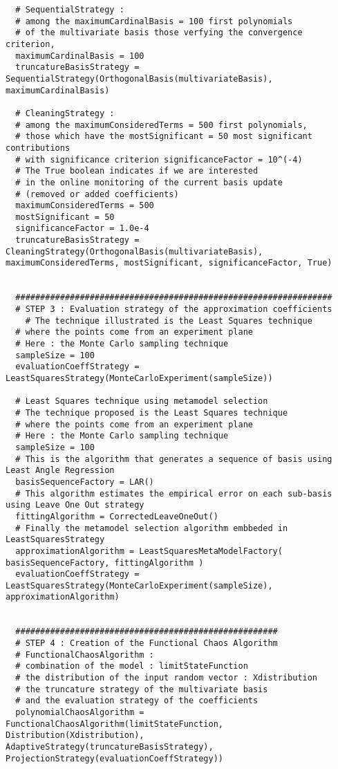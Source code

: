 \begin{lstlisting}
  # SequentialStrategy :
  # among the maximumCardinalBasis = 100 first polynomials
  # of the multivariate basis those verfying the convergence criterion,
  maximumCardinalBasis = 100
  truncatureBasisStrategy = SequentialStrategy(OrthogonalBasis(multivariateBasis), maximumCardinalBasis)

  # CleaningStrategy : 
  # among the maximumConsideredTerms = 500 first polynomials,
  # those which have the mostSignificant = 50 most significant contributions 
  # with significance criterion significanceFactor = 10^(-4)
  # The True boolean indicates if we are interested
  # in the online monitoring of the current basis update
  # (removed or added coefficients)
  maximumConsideredTerms = 500
  mostSignificant = 50
  significanceFactor = 1.0e-4
  truncatureBasisStrategy = CleaningStrategy(OrthogonalBasis(multivariateBasis), maximumConsideredTerms, mostSignificant, significanceFactor, True)


  ################################################################
  # STEP 3 : Evaluation strategy of the approximation coefficients
    # The technique illustrated is the Least Squares technique
  # where the points come from an experiment plane
  # Here : the Monte Carlo sampling technique
  sampleSize = 100
  evaluationCoeffStrategy = LeastSquaresStrategy(MonteCarloExperiment(sampleSize))

  # Least Squares technique using metamodel selection
  # The technique proposed is the Least Squares technique
  # where the points come from an experiment plane
  # Here : the Monte Carlo sampling technique
  sampleSize = 100
  # This is the algorithm that generates a sequence of basis using Least Angle Regression
  basisSequenceFactory = LAR()
  # This algorithm estimates the empirical error on each sub-basis using Leave One Out strategy
  fittingAlgorithm = CorrectedLeaveOneOut()
  # Finally the metamodel selection algorithm embbeded in LeastSquaresStrategy
  approximationAlgorithm = LeastSquaresMetaModelFactory( basisSequenceFactory, fittingAlgorithm )
  evaluationCoeffStrategy = LeastSquaresStrategy(MonteCarloExperiment(sampleSize), approximationAlgorithm)


  #####################################################
  # STEP 4 : Creation of the Functional Chaos Algorithm 
  # FunctionalChaosAlgorithm :
  # combination of the model : limitStateFunction
  # the distribution of the input random vector : Xdistribution
  # the truncature strategy of the multivariate basis
  # and the evaluation strategy of the coefficients
  polynomialChaosAlgorithm = FunctionalChaosAlgorithm(limitStateFunction, Distribution(Xdistribution), AdaptiveStrategy(truncatureBasisStrategy), ProjectionStrategy(evaluationCoeffStrategy))
\end{lstlisting}


